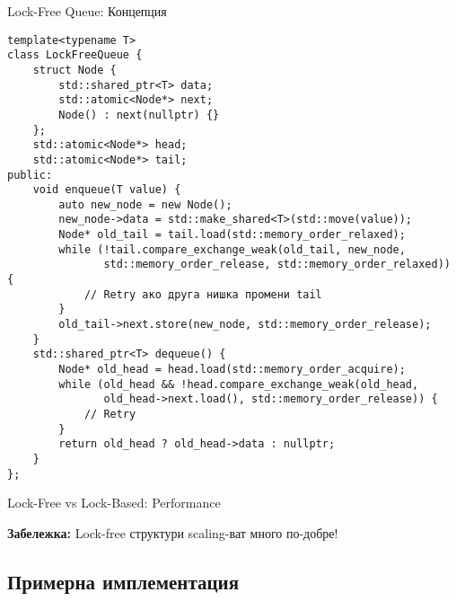 \documentclass[aspectratio=169]{beamer}
\begin{document}
\begin{frame}[fragile]{Lock-Free Queue: Концепция}
\begin{lstlisting}[basicstyle=\ttfamily\tiny]
template<typename T>
class LockFreeQueue {
    struct Node {
        std::shared_ptr<T> data;
        std::atomic<Node*> next;
        Node() : next(nullptr) {}
    };
    std::atomic<Node*> head;
    std::atomic<Node*> tail;
public:
    void enqueue(T value) {
        auto new_node = new Node();
        new_node->data = std::make_shared<T>(std::move(value));
        Node* old_tail = tail.load(std::memory_order_relaxed);
        while (!tail.compare_exchange_weak(old_tail, new_node, 
               std::memory_order_release, std::memory_order_relaxed)) {
            // Retry ако друга нишка промени tail
        }
        old_tail->next.store(new_node, std::memory_order_release);
    }
    std::shared_ptr<T> dequeue() {
        Node* old_head = head.load(std::memory_order_acquire);
        while (old_head && !head.compare_exchange_weak(old_head, 
               old_head->next.load(), std::memory_order_release)) {
            // Retry
        }
        return old_head ? old_head->data : nullptr;
    }
};
\end{lstlisting}
\end{frame}

\begin{frame}{Lock-Free vs Lock-Based: Performance}
\begin{center}
\end{center}

\textbf{Забележка:} Lock-free структури scaling-ват много по-добре!
\end{frame}

\subsection{Примерна имплементация}
\end{document}
